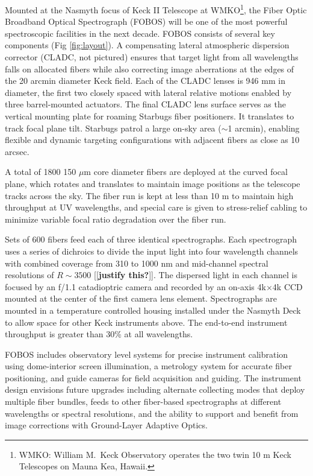 \documentclass[oneside,11pt]{amsart}
\newcommand{\comment}[2][todo]{{\color{#1}[[{\bf #2}]]}}
\begin{document}
Mounted at the Nasmyth focus of Keck II Telescope at WMKO\footnote{WMKO: William M.\ Keck Observatory operates the two twin 10 m Keck Telescopes on Mauna Kea, Hawaii.}, the Fiber Optic Broadband Optical Spectrograph (FOBOS) will be one of
the most powerful spectroscopic facilities in the next decade.  FOBOS consists of several key components (Fig
\ref{fig:layout}).  A compensating lateral atmospheric dispersion corrector (CLADC, not pictured) ensures that target
light from all wavelengths falls on allocated fibers while also correcting image aberrations at the edges of the 20
arcmin diameter Keck field.  Each of the CLADC lenses is 946 mm in diameter, the first two closely spaced with lateral
relative motions enabled by three barrel-mounted actuators.  The final CLADC lens surface serves as the vertical
mounting plate for roaming Starbugs fiber positioners.  It translates to track focal plane tilt.  Starbugs patrol a
large on-sky area ($\sim$1 arcmin), enabling flexible and dynamic targeting configurations with adjacent fibers as
close as 10 arcsec.

A total of 1800 150 $\mu$m core diameter fibers are deployed at the curved focal plane, which rotates and translates to
maintain image positions as the telescope tracks across the sky.  The fiber run is kept at less than 10 m to
maintain high throughput at UV wavelengths, and special care is given to stress-relief cabling to minimize variable
focal ratio degradation over the fiber run.

Sets of 600 fibers feed each of three identical spectrographs.  Each spectrograph uses a series of dichroics to divide
the input light into four wavelength channels with combined coverage from 310 to 1000 nm and mid-channel spectral
resolutions of $R \sim 3500$ \comment{justify this?}.  The dispersed light in each channel is focused by an f/1.1 catadioptric camera and
recorded by an on-axis 4k$\times$4k CCD mounted at the center of the first camera lens element.  Spectrographs are
mounted in a temperature controlled housing installed under the Nasmyth Deck to allow space for other Keck instruments
above.  The end-to-end instrument throughput is greater than 30\% at all wavelengths.

FOBOS includes observatory level systems for precise instrument calibration using dome-interior screen illumination, a
metrology system for accurate fiber positioning, and guide cameras for field acquisition and guiding.  The instrument
design envisions future upgrades including alternate collecting modes that deploy multiple fiber bundles, feeds to
other fiber-based spectrographs at different wavelengths or spectral resolutions, and the ability to support and
benefit from image corrections with Ground-Layer Adaptive Optics.
\end{document}
